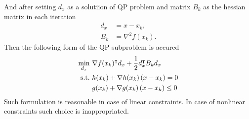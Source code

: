 And after setting $d_x$ as a solutiion of QP problem and matrix $B_k$ as the hessian matrix in each iteration
\begin{subequations}
	\begin{align}
		d_x&=x-x_k,\\
		B_k &= \nabla^2f(x_k).
	\end{align}
\end{subequations}
Then the following form of the QP subproblem is accured
\begin{subequations}
	\begin{align}
		\min_{d_x}\  &\nabla f(x_k)^\intercal d_x+\frac{1}{2}d_x^\intercal B_k d_x\\
		\text{s.t.}\  &h(x_k)+\nabla h(x_k)\left( x-x_k \right) = 0\\
		&g(x_k)+\nabla g(x_k)\left( x-x_k \right)\leq 0
	\end{align}
\end{subequations}
Such formulation is reasonable in case of linear constraints. In case of nonlinear constraints such choice is inappropriated. 

